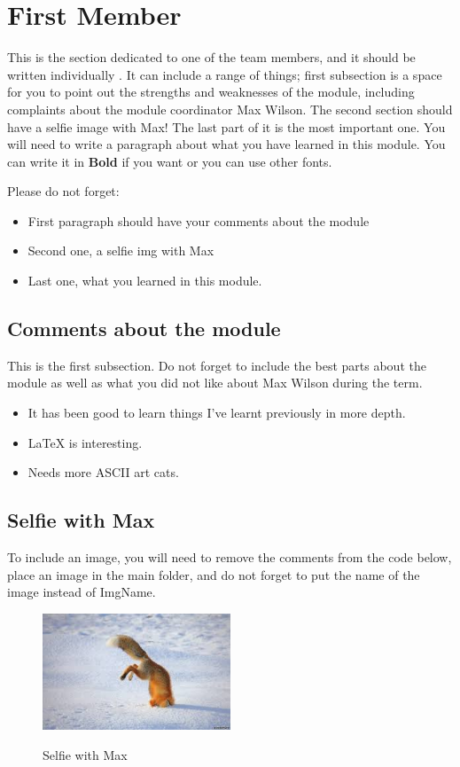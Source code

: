 \section{First Member}
This is the section dedicated to one of the team members, and it should be written individually . It can include a range of things; first subsection is a space for you to point out the strengths and weaknesses of the module, including complaints about the module coordinator Max Wilson. The second section should have a selfie image with Max! The last part of it is the most important one. You will need to write a paragraph about what you have learned in this module. You can write it in \textbf{Bold} if you want or you can use other fonts. 

Please do not forget:
\begin{itemize}
	\item First paragraph should have your comments about the module
	\item Second one, a selfie img with Max
	\item Last one, what you learned in this module.
\end{itemize}


\subsection{Comments about the module}
This is the first subsection. Do not forget to include the best parts about the module as well as what you did not like about Max Wilson during the term.

\begin{itemize}
	\item It has been good to learn things I've learnt previously in more depth.
	\item LaTeX is interesting.
	\item Needs more ASCII art cats.
\end{itemize}

\subsection{Selfie with Max}

To include an image, you will need to remove the comments from the code below, place an image in the main folder, and do not forget to put the name of the image instead of ImgName. 

\begin{figure}[h]
\caption{Selfie with Max}
\centering
\includegraphics[width=0.5\textwidth]{download}
\label{fig:selfie}
\end{figure}

